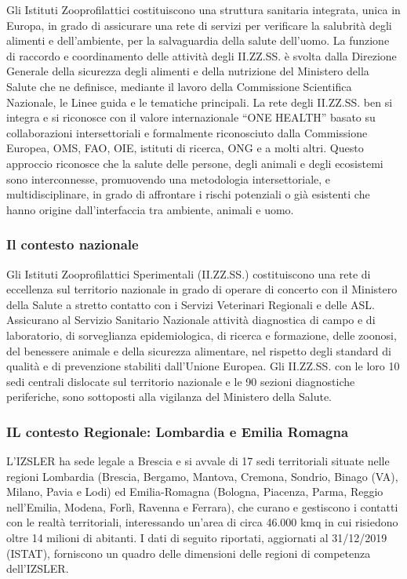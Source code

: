 \documentclass[
  12pt,
]{article}
\begin{document}
Gli Istituti Zooprofilattici costituiscono una struttura sanitaria
integrata, unica in Europa, in grado di assicurare una rete di servizi
per verificare la salubrità degli alimenti e dell'ambiente, per la
salvaguardia della salute dell'uomo. La funzione di raccordo e
coordinamento delle attività degli II.ZZ.SS. è svolta dalla Direzione
Generale della sicurezza degli alimenti e della nutrizione del Ministero
della Salute che ne definisce, mediante il lavoro della Commissione
Scientifica Nazionale, le Linee guida e le tematiche principali. La rete
degli II.ZZ.SS. ben si integra e si riconosce con il valore
internazionale ``ONE HEALTH'' basato su collaborazioni intersettoriali e
formalmente riconosciuto dalla Commissione Europea, OMS, FAO, OIE,
istituti di ricerca, ONG e a molti altri. Questo approccio riconosce che
la salute delle persone, degli animali e degli ecosistemi sono
interconnesse, promuovendo una metodologia intersettoriale, e
multidisciplinare, in grado di affrontare i rischi potenziali o già
esistenti che hanno origine dall'interfaccia tra ambiente, animali e
uomo.

\hypertarget{il-contesto-nazionale}{%
\subsubsection{Il contesto nazionale}\label{il-contesto-nazionale}}

Gli Istituti Zooprofilattici Sperimentali (II.ZZ.SS.) costituiscono una
rete di eccellenza sul territorio nazionale in grado di operare di
concerto con il Ministero della Salute a stretto contatto con i Servizi
Veterinari Regionali e delle ASL. Assicurano al Servizio Sanitario
Nazionale attività diagnostica di campo e di laboratorio, di
sorveglianza epidemiologica, di ricerca e formazione, delle zoonosi, del
benessere animale e della sicurezza alimentare, nel rispetto degli
standard di qualità e di prevenzione stabiliti dall'Unione Europea. Gli
II.ZZ.SS. con le loro 10 sedi centrali dislocate sul territorio
nazionale e le 90 sezioni diagnostiche periferiche, sono sottoposti alla
vigilanza del Ministero della Salute.

\hypertarget{il-contesto-regionale-lombardia-e-emilia-romagna}{%
\subsubsection{IL contesto Regionale: Lombardia e Emilia
Romagna}\label{il-contesto-regionale-lombardia-e-emilia-romagna}}

L'IZSLER ha sede legale a Brescia e si avvale di 17 sedi territoriali
situate nelle regioni Lombardia (Brescia, Bergamo, Mantova, Cremona,
Sondrio, Binago (VA), Milano, Pavia e Lodi) ed Emilia-Romagna (Bologna,
Piacenza, Parma, Reggio nell'Emilia, Modena, Forlì, Ravenna e Ferrara),
che curano e gestiscono i contatti con le realtà territoriali,
interessando un'area di circa 46.000 kmq in cui risiedono oltre 14
milioni di abitanti. I dati di seguito riportati, aggiornati al
31/12/2019 (ISTAT), forniscono un quadro delle dimensioni delle regioni
di competenza dell'IZSLER.
\end{document}
